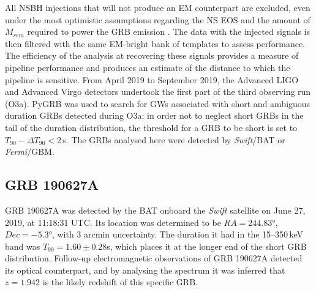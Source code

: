 \documentclass[binding=0.6cm, LaM]{sapthesis}
\begin{document}
	All NSBH injections that will not produce an EM counterpart are excluded, 
	even under the most optimistic assumptions regarding the NS EOS and the amount of $M_{rem}$ required to power the GRB emission \cite{}. 
	The data with the injected signals is then filtered with the same EM-bright bank of templates to assess performance. 
	The efficiency of the analysis at recovering these signals provides a measure of pipeline performance 
	and produces an estimate of the distance to which the pipeline is sensitive.
	From April 2019 to September 2019, the Advanced LIGO  and  Advanced  Virgo detectors undertook 
	the first part of the third observing run (O3a).
	PyGRB was used to search for GWs associated with short and ambiguous duration GRBs detected during O3a:
	in order not to neglect short GRBs in the tail of the duration distribution, 
	the threshold for a GRB to be short is set to $T_{90} − \Delta T_{90} < 2\,$s. 
	The GRBs analysed here were detected by {\it Swift}/BAT or {\it Fermi}/GBM.

\subsection{GRB 190627A}
	GRB 190627A was detected by the BAT onboard the {\it Swift} satellite on June 27, 2019, at 11:18:31 UTC.
	Its location was determined to be $RA=\ang{244.83}$, $Dec = \ang{-5.3}$, with 3 arcmin uncertainty.	
	The duration it had in the 15--350\,keV band was $T_{90} = 1.60 \pm 0.28$s, 
	which places it at the longer end of the short GRB distribution. 
	Follow-up electromagnetic observations of GRB 190627A detected its optical counterpart, 
	and by analysing the spectrum it was inferred that $z = 1.942$ is the likely redshift of this specific GRB.
\end{document}

